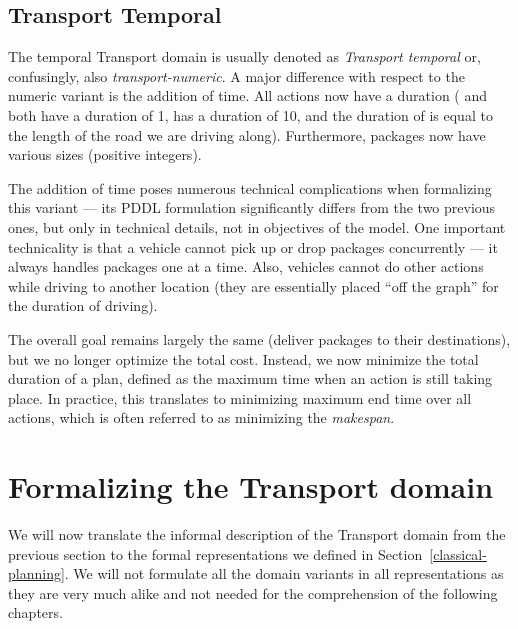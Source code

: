 \subsection{Transport Temporal}\label{transport-temporal}

The temporal Transport domain is usually denoted as \textit{Transport temporal} or, confusingly,
also \textit{transport-numeric}. A major difference with respect to the numeric variant is
the addition of time. All actions now have a duration (\pickup{} and \drop{} both have a
duration of 1,  has a duration of 10, and the duration of \drive{} is
equal to the length of the road we are driving along). Furthermore, packages  now have various sizes (positive integers).

The addition of time poses numerous technical complications when formalizing this variant
--- its PDDL formulation significantly differs from the two previous ones, but only in technical details, not in objectives of the model.
One important technicality is that a vehicle cannot pick up or drop packages concurrently --- it always handles packages one at a time. Also, vehicles cannot do other actions while driving to another location (they are essentially placed ``off the graph'' for the duration of driving).

The overall goal remains largely the same (deliver packages to their destinations), but we no longer optimize the total cost. Instead, we now minimize the total duration of a plan,
defined as the maximum time when an action is still taking place.
In practice, this translates to minimizing maximum end time over all actions, which is often referred to as minimizing the \textit{makespan}.



















\section{Formalizing the Transport domain}

We will now translate the informal description of the Transport domain from the previous section to the formal representations we defined in Section~\ref{classical-planning}. We will not formulate all the domain variants in all representations as
they are very much alike and not needed for the comprehension of the following chapters.

